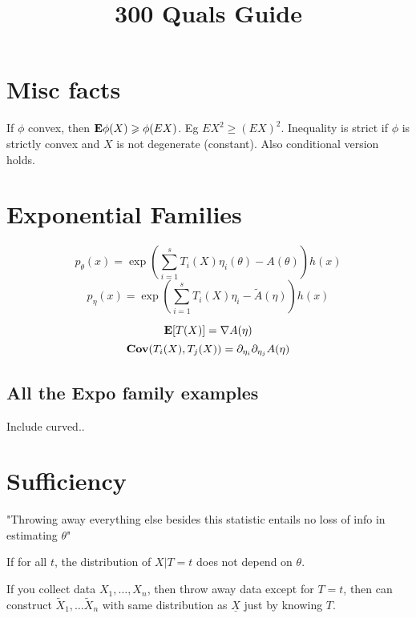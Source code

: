 \documentclass{article}
\title{300 Quals Guide}
\begin{document}
\maketitle
\section{Misc facts}
\begin{theorem}
If $\phi$ convex, then $\mathbf{E} \phi(X) \geqslant \phi(EX)$. Eg $EX^2 \geq (EX)^2$. Inequality is strict if $\phi$ is strictly convex and $X$ is not degenerate (constant). Also conditional version holds. 
\end{theorem}
\section{Exponential Families}
\begin{definition}
	$$p_\theta(x) = \exp(\sum_{i=1}^s T_i(X) \eta_i(\theta) - A(\theta))h(x)$$
	$$p_\eta(x) = \exp(\sum_{i=1}^s T_i(X) \eta_i - \tilde A(\eta)) h(x)$$
\end{definition}
\begin{fact}[$E[T(X)$, $Cov(T(X))$]
$$\mathbf{E}[T(X)] = \nabla A(\eta)$$
$$\mathbf{Cov} (T_i(X), T_j(X)) = \partial_{\eta_i} \partial_{\eta_j} A(\eta)$$
\end{fact}

\subsection{All the Expo family examples}

Include curved.. 


\section{Sufficiency} 
"Throwing away everything else besides this statistic entails no loss of info in estimating $\theta$"
\begin{definition}[Sufficiency]
If for all $t$, the distribution of $X|T=t$ does not depend on $\theta$.
\end{definition}
If you collect data $X_1,\ldots,X_n$, then throw away data except for $T=t$, then can construct $\tilde X_1,\ldots \tilde X_n$ with same distribution as $\underline{X}$ just by knowing $T$.
\end{document}
